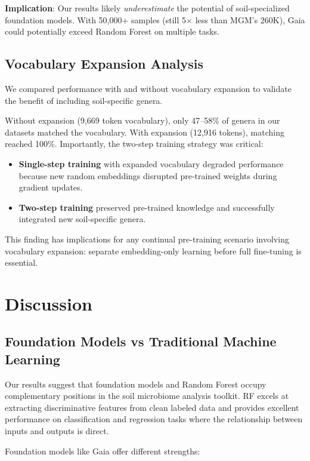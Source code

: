 \documentclass[11pt,a4paper]{article}
\begin{document}
\textbf{Implication}: Our results likely \emph{underestimate} the potential of soil-specialized foundation models. With 50,000+ samples (still 5$\times$ less than MGM's 260K), Gaia could potentially exceed Random Forest on multiple tasks.

\subsection{Vocabulary Expansion Analysis}

We compared performance with and without vocabulary expansion to validate the benefit of including soil-specific genera.

Without expansion (9,669 token vocabulary), only 47--58\% of genera in our datasets matched the vocabulary. With expansion (12,916 tokens), matching reached 100\%. Importantly, the two-step training strategy was critical:

\begin{itemize}[leftmargin=1.5em]
    \item \textbf{Single-step training} with expanded vocabulary degraded performance because new random embeddings disrupted pre-trained weights during gradient updates.
    \item \textbf{Two-step training} preserved pre-trained knowledge and successfully integrated new soil-specific genera.
\end{itemize}

This finding has implications for any continual pre-training scenario involving vocabulary expansion: separate embedding-only learning before full fine-tuning is essential.

\section{Discussion}

\subsection{Foundation Models vs Traditional Machine Learning}

Our results suggest that foundation models and Random Forest occupy complementary positions in the soil microbiome analysis toolkit. RF excels at extracting discriminative features from clean labeled data and provides excellent performance on classification and regression tasks where the relationship between inputs and outputs is direct.

Foundation models like Gaia offer different strengths:
\end{document}
